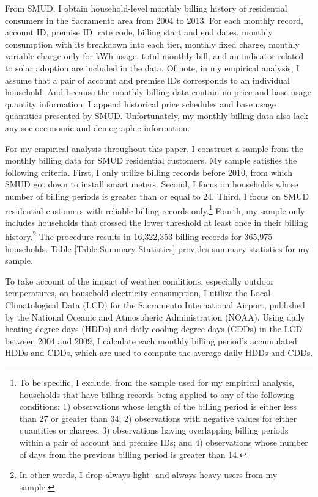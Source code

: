 From SMUD, I obtain household-level monthly billing history of residential consumers in the Sacramento area from 2004 to 2013. For each monthly record, account ID, premise ID, rate code, billing start and end dates, monthly consumption with its breakdown into each tier, monthly fixed charge, monthly variable charge only for kWh usage, total monthly bill, and an indicator related to solar adoption are included in the data. Of note, in my empirical analysis, I assume that a pair of account and premise IDs corresponds to an individual household. And because the monthly billing data contain no price and base usage quantity information, I append historical price schedules and base usage quantities presented by SMUD. Unfortunately, my monthly billing data also lack any socioeconomic and demographic information. 

For my empirical analysis throughout this paper, I construct a sample from the monthly billing data for SMUD residential customers. My sample satisfies the following criteria. First, I only utilize billing records before 2010, from which SMUD got down to install smart meters. Second, I focus on households whose number of billing periods is greater than or equal to 24. Third, I focus on SMUD residential customers with reliable billing records only.\footnote{To be specific, I exclude, from the sample used for my empirical analysis, households that have billing records being applied to any of the following conditions: 1) observations whose length of the billing period is either less than 27 or greater than 34; 2) observations with negative values for either quantities or charges; 3) observations having overlapping billing periods within a pair of account and premise IDs; and 4) observations whose number of days from the previous billing period is greater than 14.} Fourth, my sample only includes households that crossed the lower threshold at least once in their billing history.\footnote{In other words, I drop always-light- and always-heavy-users from my sample. } The procedure results in 16,322,353 billing records for 365,975 households. Table \ref{Table:Summary-Statistics} provides summary statistics for my sample. 

To take account of the impact of weather conditions, especially outdoor temperatures, on household electricity consumption, I utilize the Local Climatological Data (LCD) for the Sacramento International Airport, published by the National Oceanic and Atmospheric Administration (NOAA). Using daily heating degree days (HDDs) and daily cooling degree days (CDDs) in the LCD between 2004 and 2009, I calculate each monthly billing period's accumulated HDDs and CDDs, which are used to compute the average daily HDDs and CDDs. 
